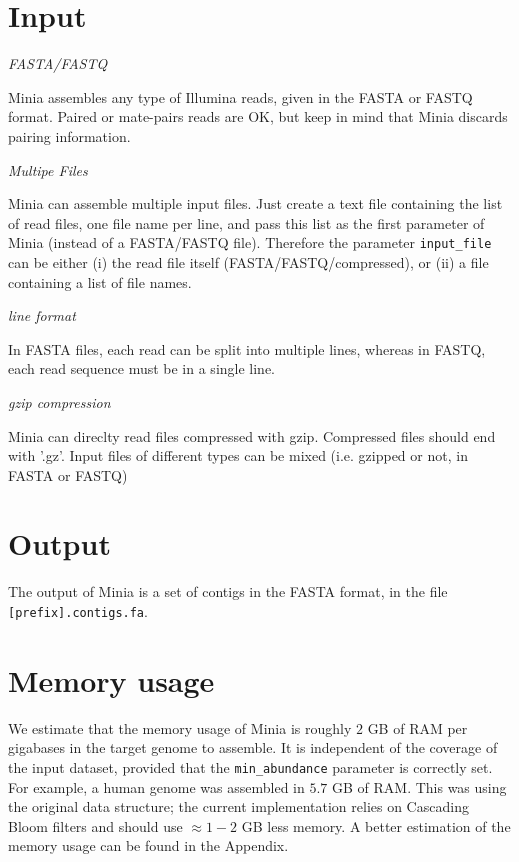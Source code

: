 \documentclass[a4paper]{article}
\begin{document}
\section{Input}

\begin{description}
\item \emph{FASTA/FASTQ}

Minia assembles any type of Illumina reads, given in the FASTA or FASTQ format. Paired or mate-pairs reads are OK, but keep in mind that Minia discards pairing information.
\item \emph{Multipe Files}

 Minia can assemble multiple input files. Just create a text file containing the list of read files, one file name per line, and pass this list as the first parameter of Minia (instead of a FASTA/FASTQ file). Therefore the parameter \verb+input_file+ can be either (i) the read file itself (FASTA/FASTQ/compressed), or (ii) a file containing a list of file names.
\item \emph{line format}

 In FASTA files, each read can be split into multiple lines, whereas in FASTQ, each read sequence must be in a single line.

\item \emph{gzip compression}

Minia can direclty read files compressed with gzip. Compressed files should end with '.gz'. Input files of different types can be mixed (i.e. gzipped or not, in FASTA or FASTQ)

\end{description}

\section{Output}

The output of Minia is a set of contigs in the FASTA format, in the file \verb+[prefix].contigs.fa+. 

\section{Memory usage}

We estimate that the memory usage of Minia is roughly $2$ GB of RAM per gigabases in the target genome to assemble. It is independent of the coverage of the input dataset, provided that the \verb!min_abundance! parameter is correctly set. For example, a human genome was assembled in $5.7$ GB of RAM. This was using the original data structure; the current implementation relies on Cascading Bloom filters and should use $\approx 1-2$ GB less memory. A better estimation of the memory usage can be found in the Appendix.
\end{document}
